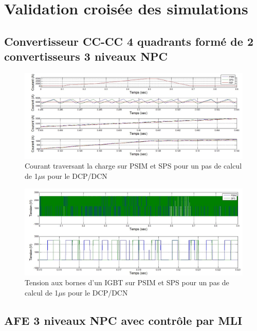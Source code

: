 \chapter{Validation croisée des simulations}

\section{Convertisseur CC-CC 4 quadrants formé de 2 convertisseurs 3 niveaux NPC}

\begin{figure}[htb]
\centering
\includegraphics[scale=0.5]{fig/DCPDCN/DCPCourantCharge1u.jpg}
\caption{Courant traversant la charge sur PSIM et SPS pour un pas de calcul de 1$\mu$s pour le DCP/DCN}
\label{DC_ch_cou_1}
\end{figure}

\begin{figure}[htb]
\centering
\includegraphics[scale=0.5]{fig/DCPDCN/DCPTensionIGBT1u.jpg}
\caption{Tension aux bornes d'un IGBT sur PSIM et SPS pour un pas de calcul de 1$\mu$s pour le DCP/DCN}
\label{DC_IG_ten_1}
\end{figure}

\section{AFE 3 niveaux NPC avec contrôle par MLI}

